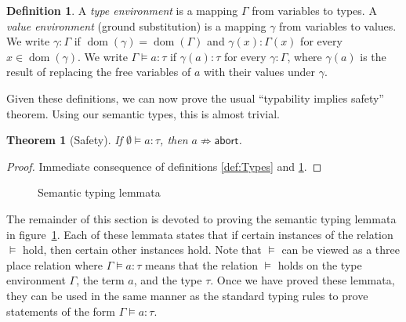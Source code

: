 \documentclass[12pt,a4paper]{article}
\theoremstyle{definition}
\newtheorem{definition}{Definition}
\theoremstyle{plain}
\newtheorem{theorem}{Theorem}
\newcommand{\abort}{\ensuremath{\mathsf{abort}}}
\newcommand{\abstr}[2]{\ensuremath{\lambda{#1}.\,{#2}}}
\newcommand{\app}[2]{\ensuremath{{#1}\,{#2}}}
\newcommand{\Nat}{\ensuremath{\mathsf{Nat}}}
\DeclareMathOperator{\dom}{dom}
\begin{document}
\begin{definition} \label{def:Typing}
  A \emph{type environment} is a mapping $\Gamma$ from variables to types. A \emph{value environment}
  (ground substitution) is a mapping $\gamma$ from variables to values. We write $\gamma : \Gamma$ if
  $\dom(\gamma) = \dom(\Gamma)$ and $\gamma(x) : \Gamma(x)$ for every $x \in \dom(\gamma)$.
  We write $\Gamma \models a : \tau$ if $\gamma(a) : \tau$ for every $\gamma : \Gamma$, where $\gamma(a)$
  is the result of replacing the free variables of $a$ with their values under $\gamma$.
\end{definition}

Given these definitions, we can now prove the usual ``typability implies safety'' theorem.
Using our semantic types, this is almost trivial.

\begin{theorem}[Safety]
  If $\emptyset \models a : \tau$, then $a \not\Rightarrow \abort$.
\end{theorem}

\begin{proof}
  Immediate consequence of definitions \ref{def:Types} and \ref{def:Typing}.
\end{proof}

\begin{figure}[htb]
  \centering
  \caption{Semantic typing lemmata}
  \label{fig:Semantic_typing_lemmata}
\end{figure}

The remainder of this section is devoted to proving the semantic typing lemmata in
figure~\ref{fig:Semantic_typing_lemmata}. Each of these lemmata states that if
certain instances of the relation $\models$ hold, then certain other instances hold.
Note that $\models$ can be viewed as a three place relation where $\Gamma \models a : \tau$
means that the relation $\models$ holds on the type environment $\Gamma$, the term $a$, and
the type $\tau$. Once we have proved these lemmata, they can be used in the same manner as
the standard typing rules to prove statements of the form $\Gamma \models a : \tau$.
\end{document}
